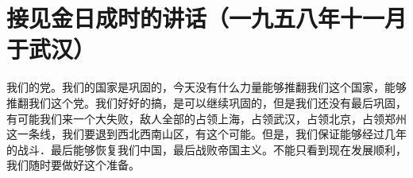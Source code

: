 \section[接见金日成时的讲话（一九五八年十一月于武汉）]{接见金日成时的讲话（一九五八年十一月于武汉）}


我们的党。我们的国家是巩固的，今天没有什么力量能够推翻我们这个国家，能够推翻我们这个党。我们好好的搞，是可以继续巩固的，但是我们还没有最后巩固，有可能我们来一个大失败，敌人全部的占领上海，占领武汉，占领北京，占领郑州这一条线，我们要退到西北西南山区，有这个可能。但是，我们保证能够经过几年的战斗．最后能够恢复我们中国，最后战败帝国主义。不能只看到现在发展顺利，我们随时要做好这个准备。


